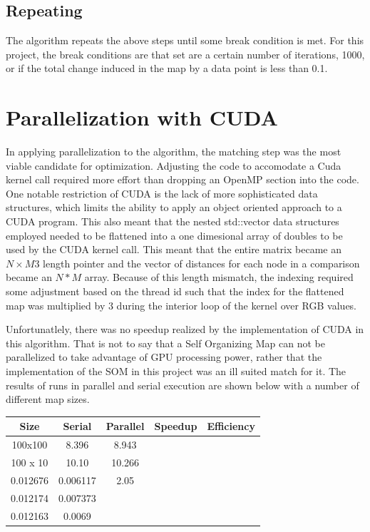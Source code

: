 \documentclass[11pt]{article}
\begin{document}
\subsection{Repeating}

The algorithm repeats the above steps until some break condition is met. For this project, the break conditions are that set are a certain number of iterations, 1000, or if the total change induced in the map by a data point is less than 0.1.

\section{Parallelization with CUDA}

In applying parallelization to the algorithm, the matching step was the most viable candidate for optimization. Adjusting the code to accomodate a Cuda kernel call required more effort than dropping an OpenMP section into the code. One notable restriction of CUDA is the lack of more sophisticated data structures, which limits the ability to apply an object oriented approach to a CUDA program. This also meant that the nested std::vector data structures employed needed to be flattened into a one dimesional array of doubles to be used by the CUDA kernel call. This meant that the entire matrix became an \(N \times M3\) length pointer and the vector of distances for each node in a comparison became an \(N*M\) array. Because of this length mismatch, the indexing required some adjustment based on the thread id such that the index for the flattened map was multiplied by 3 during the interior loop of the kernel over RGB values.

Unfortunatlely, there was no speedup realized by the implementation of CUDA in this algorithm. That is not to say that a Self Organizing Map can not be parallelized to take advantage of GPU processing power, rather that the implementation of the SOM in this project was an ill suited match for it. The results of runs in parallel and serial execution are shown below with a number of different map sizes.




\begin{table}[!htbp]
\centering
\begin{tabular}{|c|c|c|c|c|}
\hline
	Size & Serial & Parallel & Speedup & Efficiency\\
\hline
	 100x100 & 8.396 & 8.943 &  &\\
\hline
	100 x 10 & 10.10 & 10.266 & &\\
\hline
	0.012676 &  0.006117 & 2.05 & &\\
\hline
	 0.012174 & 0.007373 & & &\\
\hline
	0.012163 & 0.0069 & & &\\
\hline
\end{tabular}
\end{table}
\end{document}

